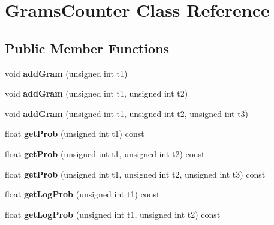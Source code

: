 \hypertarget{classGramsCounter}{}\section{Grams\+Counter Class Reference}
\label{classGramsCounter}
\subsection*{Public Member Functions}
\begin{DoxyCompactItemize}
\item 
\mbox{\label{classGramsCounter_aedbfec5dc4db03ac98f3f28362f124a2}} 
void {\bfseries add\+Gram} (unsigned int t1)
\item 
\mbox{\label{classGramsCounter_af65dc5d8a469ed925a7b23dce0429c1c}} 
void {\bfseries add\+Gram} (unsigned int t1, unsigned int t2)
\item 
\mbox{\label{classGramsCounter_a7fa78eccbb6b347f2198545b51cbdd1e}} 
void {\bfseries add\+Gram} (unsigned int t1, unsigned int t2, unsigned int t3)
\item 
\mbox{\label{classGramsCounter_a532728e0311b5f5cdd0dd9f2cd0b5115}} 
float {\bfseries get\+Prob} (unsigned int t1) const
\item 
\mbox{\label{classGramsCounter_ad9cf8f02d0a2cabcd17cac6c945b3ef6}} 
float {\bfseries get\+Prob} (unsigned int t1, unsigned int t2) const
\item 
\mbox{\label{classGramsCounter_aaf9e73b2f78e2e062bac7fd3892bdf62}} 
float {\bfseries get\+Prob} (unsigned int t1, unsigned int t2, unsigned int t3) const
\item 
\mbox{\label{classGramsCounter_ab6e4e5ed53e00ba86deb737e84f46372}} 
float {\bfseries get\+Log\+Prob} (unsigned int t1) const
\item 
\mbox{\label{classGramsCounter_aac64cb91593a3d4b15d6821e73cfa476}} 
float {\bfseries get\+Log\+Prob} (unsigned int t1, unsigned int t2) const
\item 
\mbox{\label{classGramsCounter_a714193c3fb467239794fe183befff6fc}} 

\end{DoxyCompactItemize}

